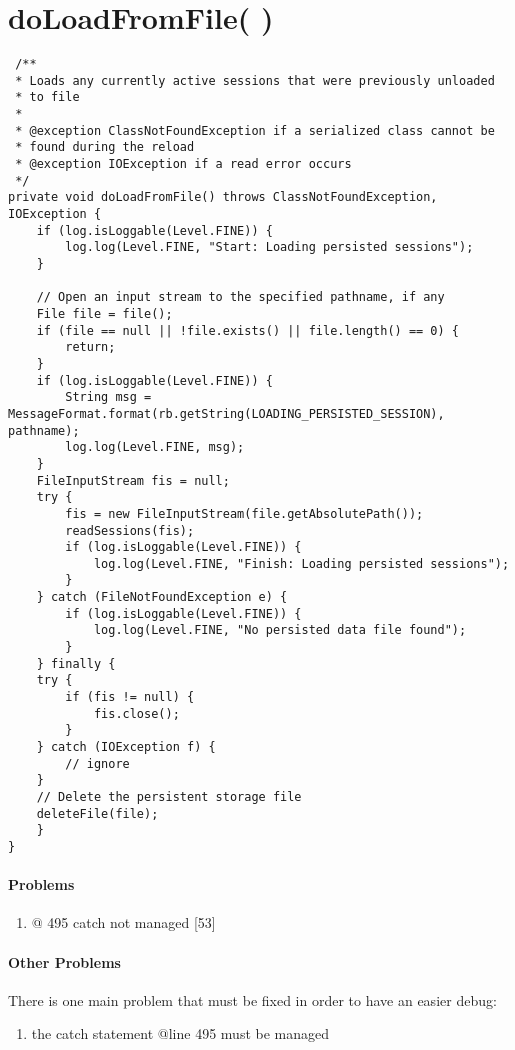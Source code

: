 
\section*{doLoadFromFile( )}

\lstset{firstnumber=457}
\begin{lstlisting}
 /**
 * Loads any currently active sessions that were previously unloaded
 * to file
 *
 * @exception ClassNotFoundException if a serialized class cannot be
 * found during the reload
 * @exception IOException if a read error occurs
 */
private void doLoadFromFile() throws ClassNotFoundException, IOException {
	if (log.isLoggable(Level.FINE)) {
		log.log(Level.FINE, "Start: Loading persisted sessions");
	}

	// Open an input stream to the specified pathname, if any
	File file = file();
	if (file == null || !file.exists() || file.length() == 0) {
		return;
	}
	if (log.isLoggable(Level.FINE)) {
		String msg = MessageFormat.format(rb.getString(LOADING_PERSISTED_SESSION), pathname);
		log.log(Level.FINE, msg);
	}
	FileInputStream fis = null;
	try {
		fis = new FileInputStream(file.getAbsolutePath());
		readSessions(fis);
		if (log.isLoggable(Level.FINE)) {
			log.log(Level.FINE, "Finish: Loading persisted sessions");
		}
	} catch (FileNotFoundException e) {
		if (log.isLoggable(Level.FINE)) {
			log.log(Level.FINE, "No persisted data file found");
		}
	} finally {
	try {
		if (fis != null) {
			fis.close();
		}
	} catch (IOException f) {
		// ignore
	}
	// Delete the persistent storage file
	deleteFile(file);
	}
}

\end{lstlisting}

\paragraph{Problems}
\begin{enumerate}
	\item @ 495 catch not managed [53]
\end{enumerate}

\paragraph{Other Problems}
There is one main problem that must be fixed in order to have an easier debug:

\begin{enumerate}
	\item the catch statement @line 495 must be managed
\end{enumerate}


